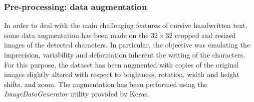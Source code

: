 \subsubsection{Pre-processing: data augmentation}
\label{sssec:preprocessingclass}

In order to deal with the main challenging features of cursive handwritten text, some data augmentation has been made on the $32 \times 32$ cropped and resized images of the detected characters. In particular, the objective was emulating the imprecision, variability and deformation inherent the writing of the characters. For this purpose, the dataset has been augmented with copies of the original images slightly altered with respect to brightness, rotation, width and height shifts, and zoom. The augmentation has been performed using the \textit{ImageDataGenerator} utility provided by Keras.
